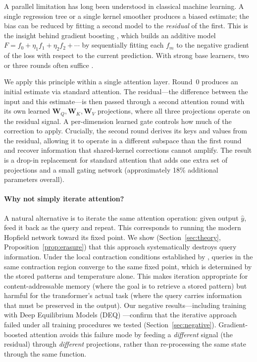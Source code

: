 \documentclass{article}
\theoremstyle{definition}
\begin{document}
A parallel limitation has long been understood in classical machine learning.
A single regression tree or a single kernel smoother produces a biased estimate; the bias can be reduced by fitting a second model to the \emph{residual} of the first.
This is the insight behind gradient boosting \citep{friedman2001greedy}, which builds an additive model $F = f_0 + \eta_1 f_1 + \eta_2 f_2 + \cdots$ by sequentially fitting each $f_m$ to the negative gradient of the loss with respect to the current prediction.
With strong base learners, two or three rounds often suffice \citep{friedman2001greedy}.

We apply this principle within a single attention layer.
Round~0 produces an initial estimate via standard attention.
The residual---the difference between the input and this estimate---is then passed through a second attention round with its own learned $\mathbf{W}_Q, \mathbf{W}_K, \mathbf{W}_V$ projections, where all three projections operate on the residual signal.
A per-dimension learned gate controls how much of the correction to apply.
Crucially, the second round derives its keys and values from the residual, allowing it to operate in a different subspace than the first round and recover information that shared-kernel corrections cannot amplify.
The result is a drop-in replacement for standard attention that adds one extra set of projections and a small gating network (approximately 18\% additional parameters overall).

\paragraph{Why not simply iterate attention?}
A natural alternative is to iterate the same attention operation: given output $\hat{y}$, feed it back as the query and repeat.
This corresponds to running the modern Hopfield network \citep{ramsauer2021hopfield} toward its fixed point.
We show (Section~\ref{sec:theory}, Proposition~\ref{prop:erasure}) that this approach systematically destroys query information.
Under the local contraction conditions established by \citet{ramsauer2021hopfield}, queries in the same contraction region converge to the same fixed point, which is determined by the stored patterns and temperature alone.
This makes iteration appropriate for content-addressable memory (where the goal is to retrieve a stored pattern) but harmful for the transformer's actual task (where the query carries information that must be preserved in the output).
Our negative results---including training with Deep Equilibrium Models (DEQ) \citep{bai2019deep}---confirm that the iterative approach failed under all training procedures we tested (Section~\ref{sec:negative}).
Gradient-boosted attention avoids this failure mode by feeding a \emph{different} signal (the residual) through \emph{different} projections, rather than re-processing the same state through the same function.
\end{document}
